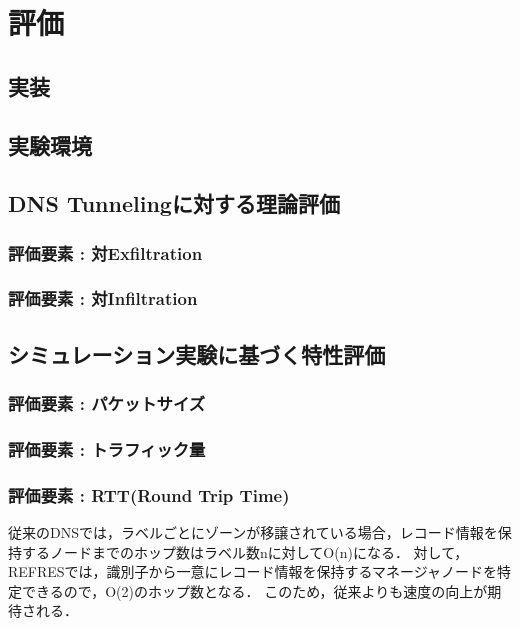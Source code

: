\section{評価}
\subsection{実装}
\subsection{実験環境}
\subsection{DNS Tunnelingに対する理論評価}
\subsubsection{評価要素 : 対Exfiltration}
\subsubsection{評価要素 : 対Infiltration}
\subsection{シミュレーション実験に基づく特性評価}
\subsubsection{評価要素 : パケットサイズ}
\subsubsection{評価要素 : トラフィック量}
\subsubsection{評価要素 : RTT(Round Trip Time)}
従来のDNSでは，ラベルごとにゾーンが移譲されている場合，レコード情報を保持するノードまでのホップ数はラベル数nに対してO(n)になる．
対して，REFRESでは，識別子から一意にレコード情報を保持するマネージャノードを特定できるので，O(2)のホップ数となる．
このため，従来よりも速度の向上が期待される．
